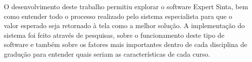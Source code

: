 

O desenvolvimento deste trabalho permitiu explorar o software Expert Sinta, bem como entender todo o processo realizado pelo sistema especialista para que o valor esperado seja retornado à tela como a melhor solução. A implementação do sistema foi feito através de pesquisas, sobre o funcionamento deste tipo de software e também sobre os fatores mais importantes dentro de cada disciplina de gradução para entender quais seriam as características de cada curso.
